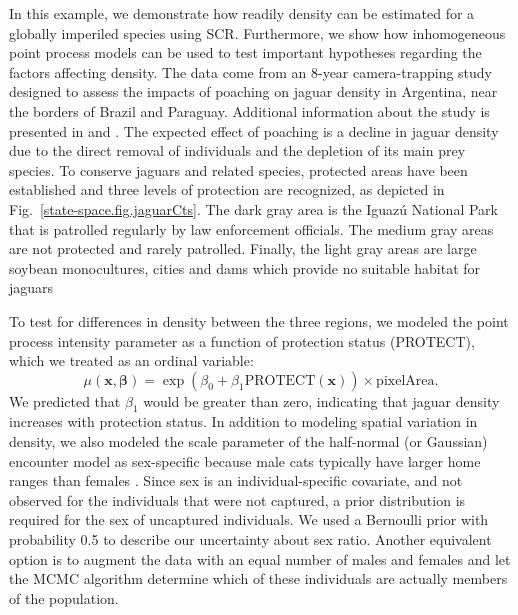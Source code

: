 In this example, we demonstrate how readily density can be estimated
for a globally imperiled species using SCR. Furthermore, we show how
inhomogeneous point process models can be used to test important
hypotheses regarding the factors affecting density.
The data come from an 8-year camera-trapping study designed to assess the impacts of poaching
on jaguar density in Argentina, near the borders of Brazil and
Paraguay. Additional information about the study is presented in
\citet{paviolo_etal:2008} and \citet{paviolo_etal:2009}.
The expected effect of poaching is a decline in jaguar
density due to the direct removal of individuals and the depletion of its
main prey species.
To conserve jaguars and related species, protected areas have
been established and three levels of protection are
recognized, as depicted in Fig.~\ref{state-space.fig.jaguarCts}.
The dark gray %
area is the Iguaz\'{u} National Park that is patrolled regularly by law enforcement
officials. %
The medium gray areas are not protected and rarely patrolled. Finally, the
light gray areas are large soybean monocultures, cities and dams which
provide no suitable habitat for jaguars

To test for differences in
density between the three regions, we modeled the point process intensity parameter
as a function of protection status (PROTECT), which we treated as an
ordinal variable:
\[
\mu(\mathbf{x}, \bm{\beta}) = \exp(\beta_0 + \beta_1\text{PROTECT}(\mathbf{x}))\times \text{pixelArea}.
\]
We predicted that $\beta_1$
would be greater than zero,
indicating that jaguar density increases with protection status. In
addition to modeling spatial variation in density, we also modeled the
scale parameter of the half-normal (or Gaussian) encounter model as
sex-specific because male cats typically have larger home ranges than
females \citep{sollmann_etal:2011}. Since sex is an
individual-specific covariate, and not observed for the individuals
that were not captured, a prior distribution is required for the sex of uncaptured
individuals. We used a Bernoulli prior with probability 0.5 to
describe our uncertainty about sex ratio. Another equivalent option is
to augment the data with an equal number of males and females and let
the MCMC algorithm determine which of these individuals are actually
members of the population.

